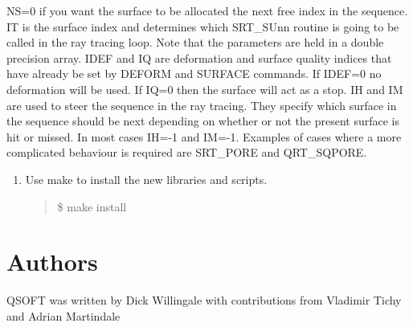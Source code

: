 \documentclass[letterpaper,10pt,english]{sphinxmanual}
\begin{document}
NS=0 if you want the surface to be allocated the next free
index in the sequence. IT is the surface index and determines
which SRT\_SUnn routine is going to be called in the ray tracing loop.
Note that the parameters are held in a double precision array.
IDEF and IQ are deformation and surface quality indices that
have already be set by DEFORM and SURFACE commands. If IDEF=0
no deformation will be used. If IQ=0 then the surface will act as a stop.
IH and IM are used
to steer the sequence in the ray tracing. They specify which
surface in the sequence should be next depending on whether or
not the present surface is hit or missed. In most cases IH=-1 and
IM=-1. Examples of cases where a more complicated behaviour is
required are SRT\_PORE and QRT\_SQPORE.
\begin{enumerate}
\def\theenumi{\arabic{enumi}}
\def\labelenumi{\theenumi .}
\makeatletter\def\p@enumii{\p@enumi \theenumi .}\makeatother
\setcounter{enumi}{5}
\item {} 
Use make to install the new libraries and scripts.
\begin{quote}

\$ make install
\end{quote}

\end{enumerate}


\chapter{Authors}
\label{\detokenize{authors:authors}}\label{\detokenize{authors::doc}}
QSOFT was written by Dick Willingale  with
contributions from Vladimir Tichy  and
Adrian Martindale 


\renewcommand{\indexname}{Python Module Index}
\begin{sphinxtheindex}
\let\bigletter\sphinxstyleindexlettergroup
\bigletter{a}
\item\relax{}
\indexspace
\bigletter{i}
\item\relax{}
\indexspace
\bigletter{q}
\item\relax{}
\indexspace
\bigletter{x}
\item\relax{}
\item\relax{}
\end{sphinxtheindex}

\renewcommand{\indexname}{Index}
\printindex
\end{document}
